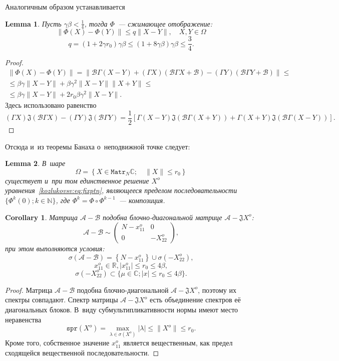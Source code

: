 \documentclass[a4paper]{article}
\newtheorem{lem}{Lemma}
\newtheorem{crl}{Corollary}
\theoremstyle{definition}
\begin{document}
Аналогичным образом устанавливается
\begin{lem}
    Пусть \(\gamma\beta<\frac14\),
    тогда \( \Phi \)~--- сжимающее отображение:
    \[ \| \Phi(X) - \Phi(Y) \| \leq q \|X - Y\|, \quad X,Y\in\Omega \]
    \[ q = (1+2\gamma r_0) \gamma\beta \leq (1+8\gamma\beta)\gamma\beta \leq \frac34. \]
\end{lem}
\begin{proof}
    \begin{align*} \| \Phi(X) - \Phi(Y) \| = \| \mathcal{B}\Gamma (X-Y) + (\Gamma X)(\mathcal{B}\Gamma X + \mathcal{B})
     - (\Gamma Y)(\mathcal{B} \Gamma Y + \mathcal{B}) \| \leq \\
        \leq
     \beta\gamma\|X-Y\| +
     \beta \gamma^2 \|X-Y\| \|X+Y\| \leq \\
        \leq
     \beta\gamma\|X-Y\| +
     2 r_0 \beta \gamma^2 \|X-Y\|.
    \end{align*}
Здесь использовано равенство
\[ (\Gamma X) \mathfrak{J}(\mathcal{B}\Gamma X) - (\Gamma Y) \mathfrak{J}(\mathcal{B}\Gamma Y) =
    \frac12\left[
        \Gamma(X-Y) \mathfrak{J}(\mathcal{B}\Gamma(X+Y))
    +   \Gamma(X+Y) \mathfrak{J}(\mathcal{B}\Gamma(X-Y))
    \right]. \]
\end{proof}

Отсюда и~из теоремы Банаха о~неподвижной точке следует:
\begin{lem}
В~шаре \[ \Omega = \left\{ X\in\mathtt{Matr}_N\mathbb{C}; \quad \|X\| \leq r_0 \right\} \]
    существует и~при том единственное решение \( X^o \) уравнения~\eqref{kozlukovsv:eq:fixptn},
    являющееся пределом последовательности \( \{ \Phi^k(0); k\in\mathbb{N} \} \),
    где \( \Phi^k = \Phi\circ\Phi^{k-1} \)~--- композиция.
\end{lem}

\begin{crl}
Матрица \( \mathcal{A} - \mathcal{B} \) подобна блочно-диагональной матрице \( \mathcal{A} - \mathfrak{J} X^o \):
\[ \mathcal{A} - \mathcal{B} \sim
\begin{pmatrix}
N - x_{11}^o & 0 \\
0 & -X_{22}^o
\end{pmatrix}, \]
при этом выполняются условия:
\[ \sigma\left(\mathcal{A} - \mathcal{B}\right) = \left\{N-x_{11}^o\right\}\cup \sigma\left(-X_{22}^o\right), \]
    \[ x_{11}^o\in\mathbb{R}, \lvert x_{11}^o \rvert \leq r_0 \leq 4\beta, \]
\[ \sigma\left(-X_{22}^o\right) \subset \{ \mu\in\mathbb{C}; \lvert x \rvert \leq r_0 \leq 4\beta \}. \]
\end{crl}
\begin{proof}
    Матрица \( \mathcal{A} - \mathcal{B} \) подобна блочно-диагональной \( \mathcal{A} - \mathfrak{J} X^o \),
    поэтому их спектры совпадают.
    Спектр матрицы \( \mathcal{A} - \mathfrak{J} X^o \) есть объединение спектров е\"е диагональных блоков.
    В~виду субмультипликативности нормы имеют место неравенства
    \[ \mathtt{spr}(X^o) = \max_{\lambda\in\sigma(X^o)}\lvert\lambda\rvert \leq \|X^o\| \leq r_0. \]
    Кроме того, собственное значение \( x_{11}^o \) является вещественным, как предел сходящейся вещественной последовательности.
\end{proof}
\end{document}
